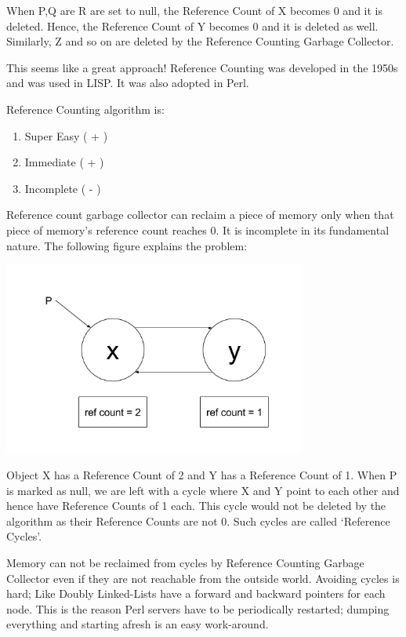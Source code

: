 \documentclass[twoside]{article}
\begin{document}
When P,Q are R are set to null, the Reference Count of X becomes 0 and it is deleted. Hence, the Reference Count of Y becomes 0 and it is deleted as well. Similarly, Z and so on are deleted by the Reference Counting Garbage Collector.

This seems like a great approach! Reference Counting was developed in the 1950s and was used in LISP. It was also adopted in Perl.

Reference Counting algorithm is:

\begin{enumerate}
\item Super Easy ( + )
\item Immediate  ( + )
\item Incomplete ( - )
\end{enumerate}

Reference count garbage collector can reclaim a piece of memory only when that piece of memory’s reference count reaches 0. It is incomplete in its fundamental nature. The following figure explains the problem:

\includegraphics[width=100mm,scale=0.5]{3.png}

Object X has a Reference Count of 2 and Y has a Reference Count of 1. When P is marked as null, we are left with a cycle where X and Y point to each other and hence have Reference Counts of 1 each. This cycle would not be deleted by the algorithm as their Reference Counts are not 0. Such cycles are called ‘Reference Cycles’.

Memory can not be reclaimed from cycles by Reference Counting Garbage Collector even if they are not reachable from the outside world. Avoiding cycles is hard; Like Doubly Linked-Lists have a forward and backward pointers for each node. This is the reason Perl servers have to be periodically restarted; dumping everything and starting afresh is an easy work-around.
\end{document}
